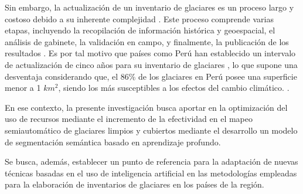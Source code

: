 Sin embargo, la actualización de un inventario de glaciares es un proceso largo y costoso debido a su inherente complejidad \cite{yan2021glacier}. Este proceso comprende varias etapas, incluyendo la recopilación de información histórica y geoespacial, el análisis de gabinete, la validación en campo, y finalmente, la publicación de los resultados \cite{barcaza2017glacier}. Es por tal motivo que países como Perú han establecido un intervalo de actualización de cinco años para su inventario de glaciares \cite{inaigem2018inventario}, lo que supone una desventaja considerando que, el 86\% de los glaciares en Perú posee una superficie menor a 1 $km^2$, siendo los más susceptibles a los efectos del cambio climático. \cite{reserva2021}.

En ese contexto, la presente investigación busca aportar en la optimización del uso de recursos mediante el incremento de la efectividad en el mapeo semiautomático de glaciares limpios y cubiertos mediante el desarrollo un modelo de segmentación semántica basado en aprendizaje profundo.

Se busca, además, establecer un punto de referencia para la adaptación de nuevas técnicas basadas en el uso de inteligencia artificial en las metodologías empleadas para la elaboración de inventarios de glaciares en los países de la región.